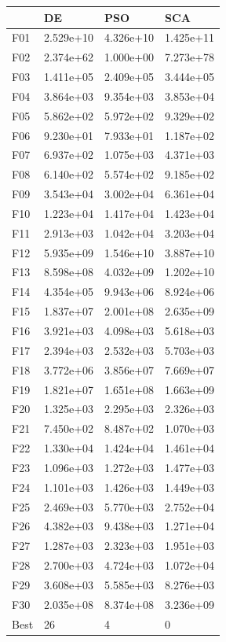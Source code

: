 \begin{tabular}{llll}
\toprule
{} &         DE &        PSO &        SCA \\
\midrule
F01  &  2.529e+10 &  4.326e+10 &  1.425e+11 \\
F02  &  2.374e+62 &  1.000e+00 &  7.273e+78 \\
F03  &  1.411e+05 &  2.409e+05 &  3.444e+05 \\
F04  &  3.864e+03 &  9.354e+03 &  3.853e+04 \\
F05  &  5.862e+02 &  5.972e+02 &  9.329e+02 \\
F06  &  9.230e+01 &  7.933e+01 &  1.187e+02 \\
F07  &  6.937e+02 &  1.075e+03 &  4.371e+03 \\
F08  &  6.140e+02 &  5.574e+02 &  9.185e+02 \\
F09  &  3.543e+04 &  3.002e+04 &  6.361e+04 \\
F10  &  1.223e+04 &  1.417e+04 &  1.423e+04 \\
F11  &  2.913e+03 &  1.042e+04 &  3.203e+04 \\
F12  &  5.935e+09 &  1.546e+10 &  3.887e+10 \\
F13  &  8.598e+08 &  4.032e+09 &  1.202e+10 \\
F14  &  4.354e+05 &  9.943e+06 &  8.924e+06 \\
F15  &  1.837e+07 &  2.001e+08 &  2.635e+09 \\
F16  &  3.921e+03 &  4.098e+03 &  5.618e+03 \\
F17  &  2.394e+03 &  2.532e+03 &  5.703e+03 \\
F18  &  3.772e+06 &  3.856e+07 &  7.669e+07 \\
F19  &  1.821e+07 &  1.651e+08 &  1.663e+09 \\
F20  &  1.325e+03 &  2.295e+03 &  2.326e+03 \\
F21  &  7.450e+02 &  8.487e+02 &  1.070e+03 \\
F22  &  1.330e+04 &  1.424e+04 &  1.461e+04 \\
F23  &  1.096e+03 &  1.272e+03 &  1.477e+03 \\
F24  &  1.101e+03 &  1.426e+03 &  1.449e+03 \\
F25  &  2.469e+03 &  5.770e+03 &  2.752e+04 \\
F26  &  4.382e+03 &  9.438e+03 &  1.271e+04 \\
F27  &  1.287e+03 &  2.323e+03 &  1.951e+03 \\
F28  &  2.700e+03 &  4.724e+03 &  1.072e+04 \\
F29  &  3.608e+03 &  5.585e+03 &  8.276e+03 \\
F30  &  2.035e+08 &  8.374e+08 &  3.236e+09 \\
Best &         26 &          4 &          0 \\
\bottomrule
\end{tabular}
